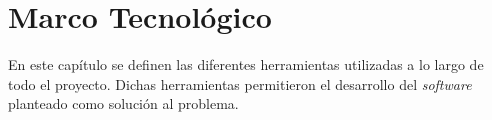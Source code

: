 \chapter{Marco Tecnológico} \label{chap:Marco Tecnologico}
En este capítulo se definen las diferentes herramientas utilizadas a lo largo de todo el proyecto. Dichas herramientas permitieron el desarrollo del \textit{software} planteado como solución al problema.
\vspace{5 mm}


